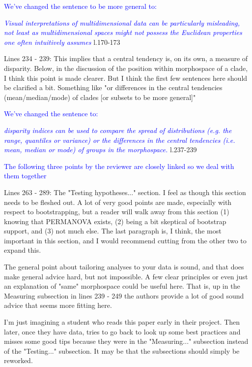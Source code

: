 \documentclass[12pt,letterpaper]{article}
\begin{document}
\textcolor{blue}{We've changed the sentence to be more general to:}

\textcolor{blue}{\textit{Visual interpretations of multidimensional data can be particularly misleading, not least as multidimensional spaces might not possess the Euclidean properties one often intuitively assumes}} l.170-173 %

\noindent Lines 234 - 239: This implies that a central tendency is, on its own, a measure of disparity. Below, in the discussion of the position within morphospace of a clade, I think this point is made clearer. But I think the first few sentences here should be clarified a bit. Something like "or differences in the central tendencies (mean/median/mode) of clades [or subsets to be more general]"

\textcolor{blue}{We've changed the sentence to:}

\textcolor{blue}{\textit{disparity indices can be used to compare the spread of distributions (e.g. the range, quantiles or variance) or the differences in the central tendencies (i.e. mean, median or mode) of groups in the morphospace.}} l.237-239 %

\textcolor{blue}{The following three points by the reviewer are closely linked so we deal with them together}

\noindent Lines 263 - 289: The "Testing hypotheses..." section. I feel as though this section needs to be fleshed out. A lot of very good points are made, especially with respect to bootstrapping, but a reader will walk away from this section (1) knowing that PERMANOVA exists, (2) being a bit skeptical of bootstrap support, and (3) not much else. The last paragraph is, I think, the most important in this section, and I would recommend cutting from the other two to expand this.

\noindent The general point about tailoring analyses to your data is sound, and that does make general advice hard, but not impossible. A few clear principles or even just an explanation of "same" morphospace could be useful here. That is, up in the Measuring subsection in lines 239 - 249 the authors provide a lot of good sound advice that seems more fitting here. 

\noindent I'm just imagining a student who reads this paper early in their project. Then later, once they have data, tries to go back to look up some best practices and misses some good tips because they were in the "Measuring..." subsection instead of the "Testing..." subsection. It may be that the subsections should simply be reworked.
\end{document}
